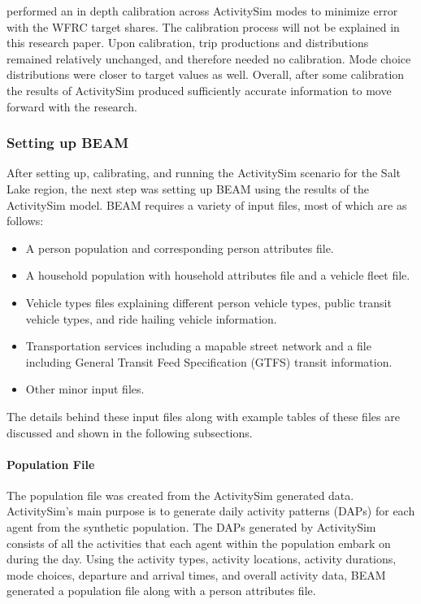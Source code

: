 \documentclass[3p, authoryear, review]{elsarticle} %
\providecommand{\tightlist}{%
  \setlength{\itemsep}{0pt}\setlength{\parskip}{0pt}}
\begin{document}
\citet{nate} performed an in depth calibration across ActivitySim modes to minimize error with the WFRC target shares. The calibration process will not be explained in this research paper. Upon calibration, trip productions and distributions remained relatively unchanged, and therefore needed no calibration. Mode choice distributions were closer to target values as well. Overall, after some calibration the results of ActivitySim produced sufficiently accurate information to move forward with the research.

\hypertarget{setting-up-beam}{%
\subsubsection{Setting up BEAM}\label{setting-up-beam}}

After setting up, calibrating, and running the ActivitySim scenario for the Salt Lake region, the next step was setting up BEAM using the results of the ActivitySim model. BEAM requires a variety of input files, most of which are as follows:

\begin{itemize}
\tightlist
\item
  A person population and corresponding person attributes file.
\item
  A household population with household attributes file and a vehicle fleet file.
\item
  Vehicle types files explaining different person vehicle types, public transit vehicle types, and ride hailing vehicle information.
\item
  Transportation services including a mapable street network and a file including General Transit Feed Specification (GTFS) transit information.
\item
  Other minor input files.
\end{itemize}

The details behind these input files along with example tables of these files are discussed and shown in the following subsections.

\hypertarget{population-file}{%
\paragraph{Population File}\label{population-file}}

The population file was created from the ActivitySim generated data. ActivitySim's main purpose is to generate daily activity patterns (DAPs) for each agent from the synthetic population. The DAPs generated by ActivitySim consists of all the activities that each agent within the population embark on during the day. Using the activity types, activity locations, activity durations, mode choices, departure and arrival times, and overall activity data, BEAM generated a population file along with a person attributes file.
\end{document}
